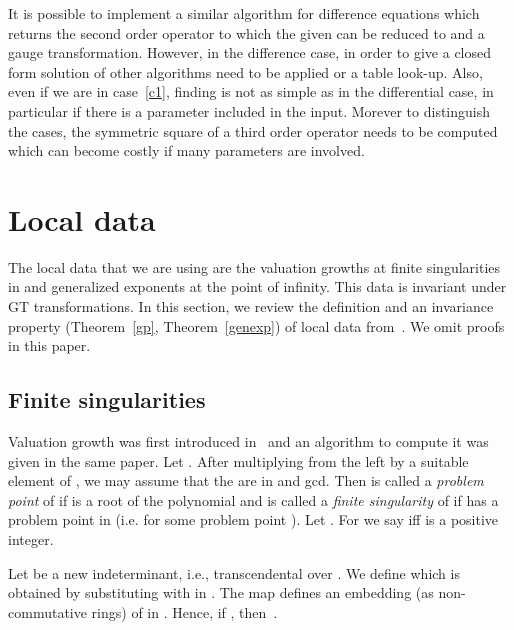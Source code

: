 \documentclass{article}
\begin{document}
 It is possible to implement a similar algorithm for difference equations which returns
 the second order operator  to which the given  can be reduced to and a gauge
 transformation.  However, in the difference case, in order to give a closed form solution
 of  other algorithms need to be applied or a table look-up. Also, even if we are in
 case~\eqref{c1}, finding  is not as simple as in the differential case, in particular
 if there is a parameter included in the input.  Morever to distinguish the cases, the
 symmetric square of a third order operator needs to be computed which can become costly
 if many parameters are involved.














\section{Local data}\label{sec:ld}

The local data that we are using are the valuation growths at finite singularities in
 and generalized exponents at the point of infinity.  This data is invariant under
GT transformations.  In this section, we review the definition and an invariance
property (Theorem~\ref{gp}, Theorem~\ref{genexp}) of local data from~\cite{YC11, CH09,
  CHG10, HO99}. We omit proofs in this paper.


\subsection{Finite singularities}
Valuation growth was first introduced in~\cite{HO99} and an algorithm to compute it was
given in the same paper. Let . After multiplying
 from the left by a suitable element of , we may assume that the
 are in  and gcd. Then  is called a {\em
   problem point} of  if  is a root of the polynomial  and  is called a {\em finite singularity} of  if  has a problem point in 
 (i.e.  for some problem point ).  Let .  For  we say  iff  is a positive integer.

 Let  be a new indeterminant, i.e., transcendental over .  We define
  which is obtained by substituting
  with  in . The map  defines an embedding
 (as non-commutative rings) of  in . Hence, if
 , then~.
\end{document}
